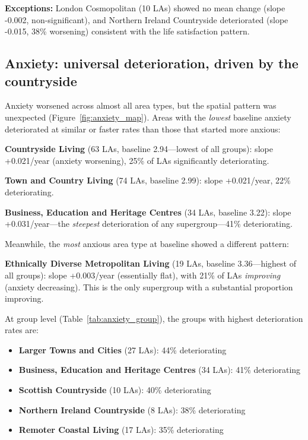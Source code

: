\documentclass[12pt,a4paper]{article}
\begin{document}
\textbf{Exceptions:} London Cosmopolitan (10 LAs) showed no mean change (slope -0.002, non-significant), and Northern Ireland Countryside deteriorated (slope -0.015, 38\% worsening) consistent with the life satisfaction pattern.

\subsection{Anxiety: universal deterioration, driven by the countryside}

Anxiety worsened across almost all area types, but the spatial pattern was unexpected (Figure~\ref{fig:anxiety_map}). Areas with the \textit{lowest} baseline anxiety deteriorated at similar or faster rates than those that started more anxious:

\textbf{Countryside Living} (63 LAs, baseline 2.94---lowest of all groups): slope +0.021/year (anxiety worsening), 25\% of LAs significantly deteriorating.

\textbf{Town and Country Living} (74 LAs, baseline 2.99): slope +0.021/year, 22\% deteriorating.

\textbf{Business, Education and Heritage Centres} (34 LAs, baseline 3.22): slope +0.031/year---the \textit{steepest} deterioration of any supergroup---41\% deteriorating.

Meanwhile, the \textit{most} anxious area type at baseline showed a different pattern:

\textbf{Ethnically Diverse Metropolitan Living} (19 LAs, baseline 3.36---highest of all groups): slope +0.003/year (essentially flat), with 21\% of LAs \textit{improving} (anxiety decreasing). This is the only supergroup with a substantial proportion improving.

At group level (Table~\ref{tab:anxiety_group}), the groups with highest deterioration rates are:
\begin{itemize}
\item \textbf{Larger Towns and Cities} (27 LAs): 44\% deteriorating
\item \textbf{Business, Education and Heritage Centres} (34 LAs): 41\% deteriorating
\item \textbf{Scottish Countryside} (10 LAs): 40\% deteriorating
\item \textbf{Northern Ireland Countryside} (8 LAs): 38\% deteriorating
\item \textbf{Remoter Coastal Living} (17 LAs): 35\% deteriorating
\end{itemize}
\end{document}
